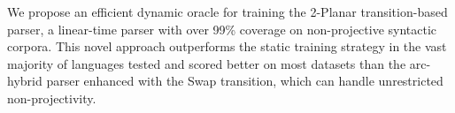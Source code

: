 We propose an efficient dynamic oracle for training the 2-Planar transition-based parser, a linear-time parser with over 99\% coverage on non-projective syntactic corpora. This novel approach outperforms the static training strategy in the vast majority of languages tested and scored better on most datasets than the arc-hybrid parser enhanced with the Swap transition, which can handle unrestricted non-projectivity.
